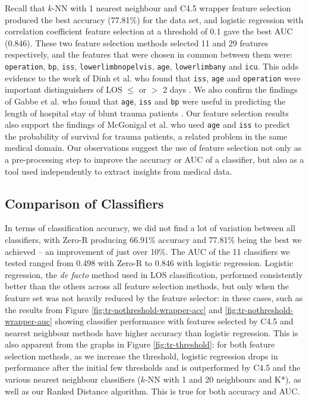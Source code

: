 \documentclass{article}
\begin{document}
Recall that $k$-NN with 1 nearest neighbour and C4.5 wrapper feature
selection produced the best accuracy (77.81\%) for the data set, and
logistic regression with correlation coefficient feature selection at a
threshold of 0.1 gave the best AUC (0.846). These two feature selection
methods selected 11 and 29 features respectively, and the features that
were chosen in common between them were: \texttt{operation}, \texttt{bp},
\texttt{iss}, \texttt{lowerlimbnopelvis}, \texttt{age}, \texttt{lowerlimbany}
and \texttt{icu}. This adds evidence to the work of Dinh et al. who found
that \texttt{iss}, \texttt{age} and \texttt{operation} were important
distinguishers of LOS $\leq$ or $>$ 2 days \cite{Dinh2013a}. We also
confirm the findings of Gabbe et al. who found that \texttt{age},
\texttt{iss} and \texttt{bp} were useful in predicting the length of
hospital stay of blunt trauma patients \cite{Gabbe2005}. Our feature
selection results also
support the findings of McGonigal et al. \cite{McGonigal1993} who used
\texttt{age} and
\texttt{iss} to predict the probability of survival for trauma patients, a
related problem in the same medical domain.
Our observations suggest the use of feature selection not only as a
pre-processing step to improve the accuracy or AUC of a classifier, but also
as a tool used independently to extract insights from medical data.




\subsection{Comparison of Classifiers}
In terms of classification accuracy, we did not find a lot of variation
between all classifiers, with Zero-R producing 66.91\% accuracy and 77.81\%
being the best we achieved -- an improvement of just over 10\%. The AUC of
the 11 classifiers we tested ranged from 0.498 with Zero-R to 0.846 with
logistic regression. Logistic regression, the \textit{de facto} method
used in LOS classification, performed consistently better than the others
across all feature
selection methods, but only when the feature set was not heavily reduced by
the feature selector: in these cases, such as the results from Figure
\ref{fig:tr-nothreshold-wrapper-acc} and \ref{fig:tr-nothreshold-wrapper-auc}
showing classifier performance with features
selected by C4.5 and nearest
neighbour methods have higher accuracy than logistic regression. This is also
apparent from the graphs in Figure \ref{fig:tr-threshold}: for both
feature selection methods, as we increase the threshold, logistic regression
drops in performance after the initial few thresholds and is outperformed by
C4.5 and the various nearest neighbour classifiers ($k$-NN with 1 and 20
neighbours and K*), as well as our Ranked Distance algorithm.
This is true for both accuracy and AUC.
\end{document}
